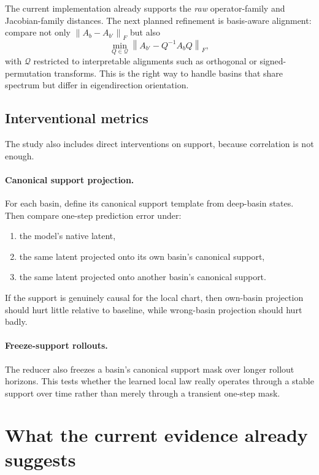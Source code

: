 \documentclass[11pt]{article}
\newcommand{\norm}[1]{\left\lVert #1 \right\rVert}
\begin{document}
The current implementation already supports the \emph{raw} operator-family and
Jacobian-family distances. The next planned refinement is basis-aware
alignment: compare not only $\norm{A_b - A_{b'}}_F$ but also
\begin{equation}
    \min_{Q \in \mathcal{Q}} \norm{A_{b'} - Q^{-1} A_b Q}_F,
\end{equation}
with $\mathcal{Q}$ restricted to interpretable alignments such as orthogonal or
signed-permutation transforms. This is the right way to handle basins that
share spectrum but differ in eigendirection orientation.

\subsection{Interventional metrics}

The study also includes direct interventions on support, because correlation is
not enough.

\paragraph{Canonical support projection.}
For each basin, define its canonical support template from deep-basin states.
Then compare one-step prediction error under:
\begin{enumerate}[leftmargin=1.5em]
    \item the model's native latent,
    \item the same latent projected onto its own basin's canonical support,
    \item the same latent projected onto another basin's canonical support.
\end{enumerate}

If the support is genuinely causal for the local chart, then own-basin
projection should hurt little relative to baseline, while wrong-basin
projection should hurt badly.

\paragraph{Freeze-support rollouts.}
The reducer also freezes a basin's canonical support mask over longer rollout
horizons. This tests whether the learned local law really operates through a
stable support over time rather than merely through a transient one-step mask.

\section{What the current evidence already suggests}
\end{document}
